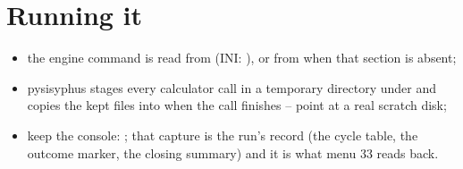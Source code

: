 \section{Running it}

\begin{itemize}
  \item the engine command is read from 
    (INI: ), or from  when that
    section is absent;
  \item pysisyphus stages every calculator call in a temporary directory under
     and copies the kept files into  when the
    call finishes -- point  at a real scratch disk;
  \item keep the console: ; that capture is the
    run's record (the cycle table, the outcome marker, the closing summary)
    and it is what menu 33 reads back.
\end{itemize}
